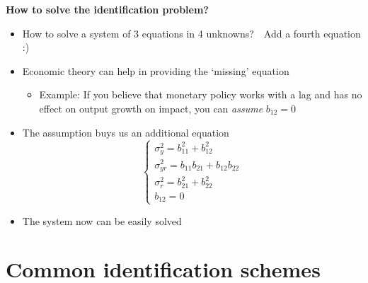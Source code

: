 \documentclass[10pt,english,t,aspectratio=169,ignorenonframetext]{beamer}
\begin{document}
\begin{frame}
{\textbf{How to solve the identification problem?}}\smallskip

\begin{itemize}
\item How to solve a system of 3 equations in 4 unknowns?\pause \ \ Add a
fourth equation :)\bigskip\pause

\item Economic theory can help in providing the `missing' equation \smallskip
\begin{itemize}
\item Example: If you believe that monetary policy works with a
lag and has no effect on output growth on impact, you can \emph{assume} $%
b_{12}=0$\bigskip\pause
\end{itemize}

\item The assumption buys us an additional equation%
\begin{equation*}
\left\{ 
\begin{array}{l}
\sigma _{y}^{2}=b_{11}^{2}+b_{12}^{2} \\ 
\sigma _{yr}^{2}=b_{11}b_{21}+b_{12}b_{22} \\ 
\sigma _{r}^{2}=b_{21}^{2}+b_{22}^{2} \\ 
b_{12}=0%
\end{array}%
\right.
\end{equation*}

\item The system now can be easily solved
\end{itemize}
\end{frame}


\section{Common identification schemes}

\begin{frame}
\vspace{3cm}\color{title} 
\end{frame}

\end{document}
